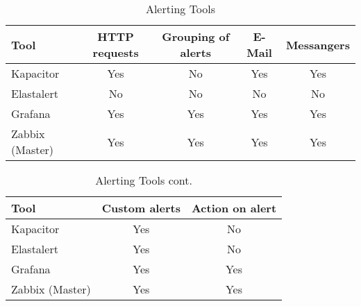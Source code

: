 \begin{table}
	\centering
	
	\label{tab:Alerting}
	\begin{tabular}{lcccc}
		\hline
Tool & HTTP requests & Grouping of alerts         & E-Mail                      & Messangers \\
\hline
Kapacitor                    & Yes           & No & Yes                         & Yes \\
Elastalert & No & No & No & No \\
Grafana                      & Yes           & Yes                        & Yes & Yes \\
Zabbix (Master)              & Yes           & Yes                        & Yes                         & Yes \\
		\hline
	\end{tabular}
	\caption{Alerting Tools}
\end{table}

\begin{table}
	\centering
	
	\label{tab:Alertingcont}
	\begin{tabular}{lcc}
		\hline
		Tool & Custom alerts & Action on alert \\
		\hline
		Kapacitor                    & Yes           & No              \\
		Elastalert                   & Yes           & No              \\
		Grafana                      & Yes           & Yes             \\
		Zabbix (Master)              & Yes           & Yes           \\
		\hline 
	\end{tabular}
	\caption{Alerting Tools cont.}
\end{table}